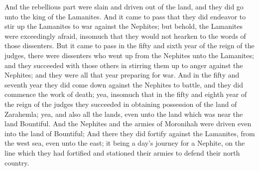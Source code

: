 \bverse \iffalse And the rebellious part were slain and driven out of the land, and they did go unto the king of the Lamanites. \fi
And the rebellious part were slain and driven out of the land, and they did go unto the king of the Lamanites.
\bverse \iffalse And it came to pass that they did endeavor to stir up the Lamanites to war against the Nephites; but behold, the Lamanites were exceedingly afraid, insomuch that they would not hearken to the words of those dissenters. \fi
And it came to pass that they did endeavor to stir up the Lamanites to war against the Nephites; but behold, the Lamanites were exceedingly afraid, insomuch that they would not hearken to the words of those dissenters.
\bverse \iffalse But it came to pass in the fifty and sixth year of the reign of the judges, there were dissenters who went up from the Nephites unto the Lamanites; and they succeeded with those others in stirring them up to anger against the Nephites; and they were all that year preparing for war. \fi
But it came to pass in the fifty and sixth year of the reign of the judges, there were dissenters who went up from the Nephites unto the Lamanites; and they succeeded with those others in stirring them up to anger against the Nephites; and they were all that year preparing for war.
\bverse \iffalse And in the fifty and seventh year they did come down against the Nephites to battle, and they did commence the work of death; yea, insomuch that in the fifty and eighth year of the reign of the judges they succeeded in obtaining possession of the land of Zarahemla; yea, and also all the lands, even unto the land which was near the land Bountiful. \fi
And in the fifty and seventh year they did come down against the Nephites to battle, and they did commence the work of death; yea, insomuch that in the fifty and eighth year of the reign of the judges they succeeded in obtaining possession of the land of Zarahemla; yea, and also all the lands, even unto the land which was near the land Bountiful.
\bverse \iffalse And the Nephites and the armies of Moronihah were driven even into the land of Bountiful; \fi
And the Nephites and the armies of Moronihah were driven even into the land of Bountiful;
\bverse \iffalse And there they did fortify against the Lamanites, from the west sea, even unto the east; it being a day's journey for a Nephite, on the line which they had fortified and stationed their armies to defend their north country. \fi
And there they did fortify against the Lamanites, from the west sea, even unto the east; it being a day's journey for a Nephite, on the line which they had fortified and stationed their armies to defend their north country.
